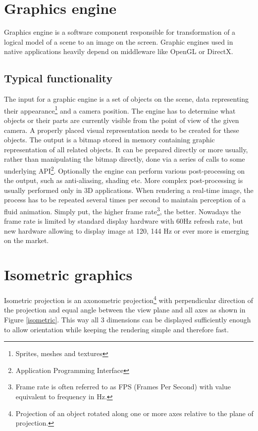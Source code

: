 \documentclass[11pt,oneside, final]{fithesis2}
\begin{document}
\section{Graphics engine}
Graphics engine is a software component responsible for transformation of a logical model of a scene to an image on the screen. Graphic engines used in native applications heavily depend on middleware like OpenGL or DirectX\cite{gregory}.

\subsection{Typical functionality}
The input for a graphic engine is a set of objects on the scene, data representing their appearance\footnote{Sprites, meshes and textures} and a camera position. The engine has to determine what objects or their parts are currently visible from the point of view of the given camera. A properly placed visual representation needs to be created for these objects. The output is a bitmap stored in memory containing graphic representation of all related objects. It can be prepared directly or more usually, rather than manipulating the bitmap directly, done via a series of calls to some underlying API\footnote{Application Programming Interface}. Optionally the engine can perform various post-processing on the output, such as anti-aliasing, shading etc.\cite{gregory} More complex post-processing is usually performed only in 3D applications. When rendering a real-time image, the process has to be repeated several times per second to maintain perception of a fluid animation. Simply put, the higher frame rate\footnote{Frame rate is often referred to as FPS (Frames Per Second) with value equivalent to frequency in Hz.}, the better\cite{claypool}. Nowadays the frame rate is limited by standard display hardware with 60Hz refresh rate, but new hardware allowing to display image at 120, 144 Hz or ever more is emerging on the market.

\section{Isometric graphics}
Isometric projection is an axonometric projection\footnote{Projection of an object rotated along one or more axes relative to the plane of projection\cite{maynard}.} with perpendicular direction of the projection and equal angle between the view plane and all axes\cite{desai} as shown in Figure \ref{isometric}. This way all 3 dimensions can be displayed sufficiently enough to allow orientation while keeping the rendering simple and therefore fast. 
\end{document}
